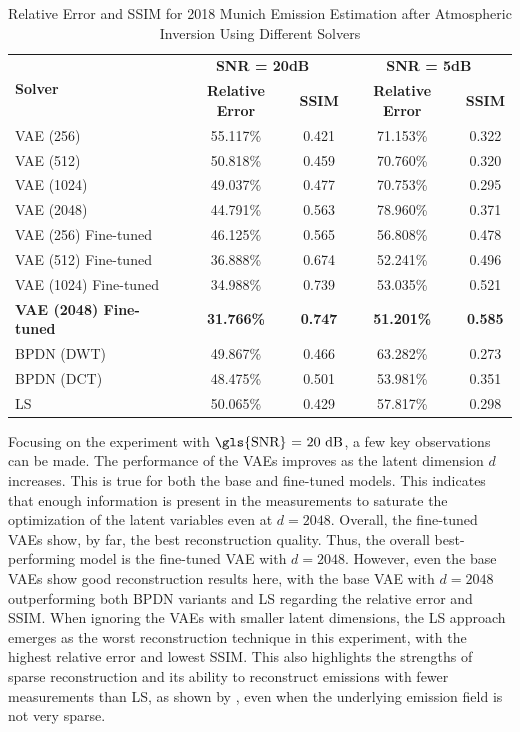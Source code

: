 \begin{table}[htb]
    \centering
    \begin{tabular}{|l|c|c|c|c|}
        \hline
        \multirow{2}{*}{\textbf{Solver}} & \multicolumn{2}{c|}{\textbf{\gls{SNR} = 20dB}} & \multicolumn{2}{c|}{\textbf{\gls{SNR} = 5dB}} \\
        \cline{2-5}
        & \textbf{Relative Error} & \textbf{SSIM} & \textbf{Relative Error} & \textbf{SSIM} \\
        \hline
        \hline
        \gls{VAE} (256) & 55.117\% & 0.421 & 71.153\% & 0.322 \\
        \gls{VAE} (512) & 50.818\% & 0.459 & 70.760\% & 0.320 \\
        \gls{VAE} (1024) & 49.037\% & 0.477 & 70.753\% & 0.295 \\
        \gls{VAE} (2048) & 44.791\% & 0.563 & 78.960\% & 0.371 \\
        \hline
        \gls{VAE} (256) Fine-tuned & 46.125\% & 0.565 & 56.808\% & 0.478 \\
        \gls{VAE} (512) Fine-tuned & 36.888\% & 0.674 & 52.241\% & 0.496 \\
        \gls{VAE} (1024) Fine-tuned & 34.988\% & 0.739 & 53.035\% & 0.521 \\
        \textbf{\gls{VAE} (2048) Fine-tuned} & \textbf{31.766\%} & \textbf{0.747} & \textbf{51.201\%} & \textbf{0.585} \\
        \hline
        BPDN (DWT) & 49.867\% & 0.466 & 63.282\% & 0.273 \\
        BPDN (DCT) & 48.475\% & 0.501 & 53.981\% & 0.351 \\
        \hline
        LS & 50.065\% & 0.429 & 57.817\% & 0.298 \\
        \hline
    \end{tabular}
    \caption{Relative Error and SSIM for 2018 Munich Emission Estimation after Atmospheric Inversion Using Different Solvers}
    \label{tab:case_study_munich}
\end{table}

Focusing on the experiment with $\text{\gls{SNR} = 20 \unit{dB}}$, a few key observations can be made.
The performance of the \gls{VAE}s improves as the latent dimension $d$ increases.
This is true for both the base and fine-tuned models.
This indicates that enough information is present in the measurements to saturate the optimization of the latent variables even at $d = 2048$.
Overall, the fine-tuned \gls{VAE}s show, by far, the best reconstruction quality.
Thus, the overall best-performing model is the fine-tuned \gls{VAE} with $d=2048$.
However, even the base \gls{VAE}s show good reconstruction results here, with the base \gls{VAE} with $d=2048$ outperforming both \gls{BPDN} variants and \gls{LS} regarding the relative error and \gls{SSIM}.
When ignoring the \gls{VAE}s with smaller latent dimensions, the \gls{LS} approach emerges as the worst reconstruction technique in this experiment, with the highest relative error and lowest \gls{SSIM}.
This also highlights the strengths of sparse reconstruction and its ability to reconstruct emissions with fewer measurements than \gls{LS}, as shown by \textcite{UrbanSparseReconstruction}, even when the underlying emission field is not very sparse.

